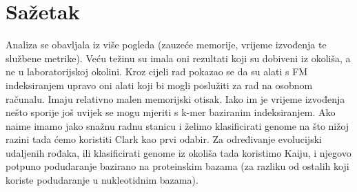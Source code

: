 \documentclass[times, utf8, seminar]{fer}
\begin{document}
\chapter{Sažetak}
Analiza se obavljala iz više pogleda (zauzeće memorije, vrijeme izvođenja te službene metrike). Veću težinu su imala oni rezultati koji su dobiveni iz okoliša, a ne u laboratorijskoj okolini.
Kroz cijeli rad pokazao se da su alati s FM indeksiranjem upravo oni alati koji bi mogli poslužiti za rad na osobnom računalu. Imaju relativno malen memorijski otisak. Iako im je vrijeme izvođenja nešto sporije još uvijek se mogu mjeriti s k-mer baziranim indeksiranjem. Ako naime imamo jako snažnu radnu stanicu i želimo klasificirati genome na što nižoj razini tada ćemo koristiti Clark kao prvi odabir. Za određivanje evolucijski udaljenih rođaka, ili klasificirati genome iz okoliša tada koristimo Kaiju, i njegovo potpuno podudaranje bazirano na proteinskim bazama (za razliku od ostalih koji koriste podudaranje u nukleotidnim bazama).
\end{document}
